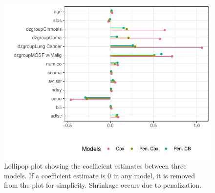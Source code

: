 \documentclass[
]{jss}
\begin{document}
\begin{CodeChunk}
\begin{figure}

{\centering \includegraphics[width=\textwidth,keepaspectratio=true]{../figures/coefplots-1} 

}

\caption{\label{fig:cs3lolliPlot} Lollipop plot showing the coefficient estimates between three models. If a coefficient estimate is 0 in any model, it is removed from the plot for simplicity. Shrinkage occurs due to penalization.}\label{fig:coefplots}
\end{figure}
\end{CodeChunk}
\end{document}
